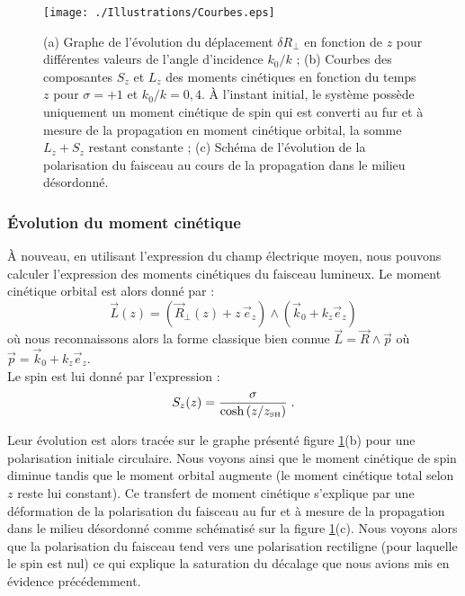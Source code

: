 \documentclass[a4paper,11pt]{article} %
\begin{document}
	
	\begin{figure}[h]
		\centering
		\begin{minipage}[c]{0.85\linewidth}
			\centering
			\texttt{[image: ./Illustrations/Courbes.eps]}
			\caption{(a) Graphe de l'évolution du déplacement $ \delta R_\perp $ en fonction de $ z $ pour différentes valeurs de l'angle d'incidence $k_0/k $ ; (b) Courbes des composantes $ S_z $ et $ L_z $ des moments cinétiques en fonction du temps $ z $ pour $ \sigma = + 1 $ et $ k_0 / k = 0,4 $. \`{A} l'instant initial, le système possède uniquement un moment cinétique de spin qui est converti au fur et à mesure de la propagation en moment cinétique orbital, la somme $ L_z + S_z $ restant constante ; (c) Schéma de l'évolution de la polarisation du faisceau au cours de la propagation dans le milieu désordonné.}
			\label{fig:Plot}
		\end{minipage}
	\end{figure}
	
	\subsubsection{\'Evolution du moment cinétique}
	\`A nouveau, en utilisant l'expression du champ électrique moyen, nous pouvons calculer l'expression des moments cinétiques du faisceau lumineux. Le moment cinétique orbital est alors donné par :
	\begin{equation*}
		\label{exp_L(z)}
		\vec{L}(z) = \left(\vec{R}_\perp(z) + z \, \vec{e}_z \right) \wedge ( \vec{k}_0 + k_z \vec{e}_z ) 
	\end{equation*}
	où nous reconnaissons alors la forme classique bien connue $ \vec{L} = \vec{R} \wedge \vec{p} $ où $ \vec{p} = \vec{k}_0 + k_z \vec{e}_z $.\\
	
	Le spin est lui donné par l'expression :
	\begin{equation}
		\label{exp_S(z)}
		S_z(z) =  \frac{ \sigma}{ \cosh \left( z/z_\text{{\tiny SH}} \right) } \; .
	\end{equation}
	
	Leur évolution est alors tracée sur le graphe présenté figure \ref{fig:Plot}(b) pour une polarisation initiale circulaire. Nous voyons ainsi que le moment cinétique de spin diminue tandis que le moment orbital augmente (le moment cinétique total selon $ z $ reste lui constant). Ce transfert de moment cinétique s'explique par une déformation de la polarisation du faisceau au fur et à mesure de la propagation dans le milieu désordonné comme schématisé sur la figure \ref{fig:Plot}(c). Nous voyons alors que la polarisation du faisceau tend vers une polarisation rectiligne (pour laquelle le spin est nul) ce qui explique la saturation du décalage que nous avions mis en évidence précédemment.
	
\end{document}
